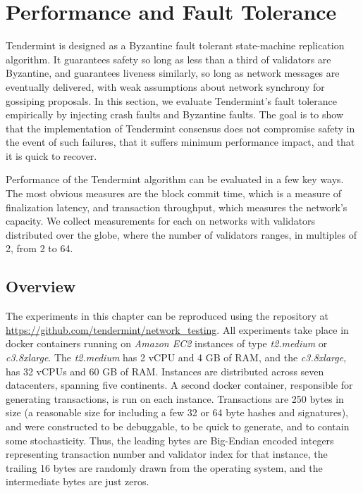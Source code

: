 \chapter{Performance and Fault Tolerance}
\label{ch:performance}

Tendermint is designed as a Byzantine fault tolerant state-machine replication algorithm.
It guarantees safety so long as less than a third of validators are Byzantine, 
and guarantees liveness similarly, so long as network messages are eventually delivered,
with weak assumptions about network synchrony for gossiping proposals.
In this section, we evaluate Tendermint's fault tolerance empirically by injecting 
crash faults and Byzantine faults.
The goal is to show that the implementation of Tendermint consensus does not compromise safety in the event of such failures,
that it suffers minimum performance impact, and that it is quick to recover.

Performance of the Tendermint algorithm can be evaluated in a few key ways.
The most obvious measures are the block commit time, which is a measure of finalization latency, 
and transaction throughput, which measures the network's capacity.
We collect measurements for each on networks with validators distributed over the globe, 
where the number of validators ranges, in multiples of 2, from 2 to 64.

\section{Overview}

The experiments in this chapter can be reproduced using the repository at \url{https://github.com/tendermint/network\_testing}.
All experiments take place in docker containers 
running on \emph{Amazon EC2} instances of type \emph{t2.medium} or \emph{c3.8xlarge}.
The \emph{t2.medium} has 2 vCPU and 4 GB of RAM,
and the \emph{c3.8xlarge}, has 32 vCPUs and 60 GB of RAM.
Instances are distributed across seven datacenters, spanning five continents.
A second docker container, responsible for generating transactions, is run on each instance.
Transactions are 250 bytes in size (a reasonable size for including a few 32 or 64 byte hashes and signatures),
and were constructed to be debuggable, to be quick to generate, and to contain some stochasticity.
Thus, the leading bytes are Big-Endian encoded integers 
representing transaction number and validator index for that instance,
the trailing 16 bytes are randomly drawn from the operating system, 
and the intermediate bytes are just zeros.

